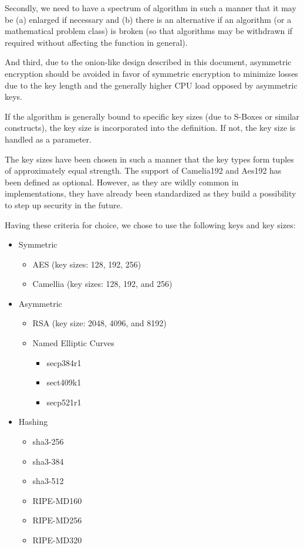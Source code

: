 Secondly, we need to have a spectrum of algorithm in such a manner that it may be (a) enlarged if necessary and (b) there is an alternative if an algorithm (or a mathematical problem class) is broken (so that algorithms may be withdrawn if required without affecting the function in general). 

And third, due to the onion-like design described in this document, asymmetric encryption should be avoided in favor of symmetric encryption to minimize losses due to the key length and the generally higher CPU load opposed by asymmetric keys.

If the algorithm is generally bound to specific key sizes (due to S-Boxes or similar constructs), the key size is incorporated into the definition. If not, the key size is handled as a parameter.

The key sizes have been chosen in such a manner that the key types form tuples of approximately equal strength. The support of Camelia192 and Aes192 has been defined as optional. However, as they are wildly common in implementations, they have already been standardized as they build a possibility to step up security in the future.

Having these criteria for choice, we chose to use the following keys and key sizes:
\begin{itemize}
	\item Symmetric
	\begin{itemize}
		\item AES (key sizes: 128, 192, 256)
		\item Camellia (key sizes: 128, 192, and 256)
	\end{itemize}
	\item Asymmetric
	\begin{itemize}
		\item RSA (key size: 2048, 4096, and 8192)
		\item Named Elliptic Curves
		\begin{itemize}
			\item secp384r1
			\item sect409k1
			\item secp521r1
		\end{itemize}
	\end{itemize}
	\item Hashing
	\begin{itemize}
		\item sha3-256
		\item sha3-384
		\item sha3-512
		\item RIPE-MD160
		\item RIPE-MD256
		\item RIPE-MD320
	\end{itemize}
\end{itemize}

